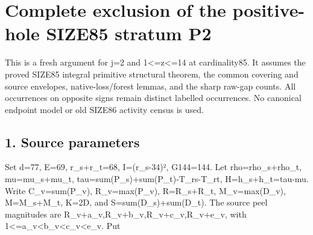\documentclass[10pt,a4paper]{article}
\theoremstyle{definition}
\begin{document}
\clearpage
\hypertarget{complete-exclusion-of-the-positive-hole-size85-stratum-p2}{%
\section{Complete exclusion of the positive-hole SIZE85 stratum
P2}\label{complete-exclusion-of-the-positive-hole-size85-stratum-p2}}

This is a fresh argument for j=\allowbreak{}2 and 1\textless=\allowbreak{}z\textless=\allowbreak{}14 at
cardinality85. It assumes the proved SIZE85 integral primitive
structural theorem,\allowbreak{} the common covering and source envelopes,\allowbreak{}
native-loss/forest lemmas,\allowbreak{} and the sharp raw-gap counts. All occurrences
on opposite signs remain distinct labelled occurrences. No canonical
endpoint model or old SIZE86 activity census is used.

\hypertarget{source-parameters}{%
\subsection{1. Source parameters}\label{source-parameters}}

Set d=\allowbreak{}77,\allowbreak{} \textbar E\textbar=\allowbreak{}69,\allowbreak{} r\_\allowbreak{}s+\allowbreak{}r\_\allowbreak{}t=\allowbreak{}68,\allowbreak{} I=\allowbreak{}(r\_\allowbreak{}s-34)²,\allowbreak{} G144=\allowbreak{}144.
Let rho=\allowbreak{}rho\_\allowbreak{}s+\allowbreak{}rho\_\allowbreak{}t,\allowbreak{} mu=\allowbreak{}mu\_\allowbreak{}s+\allowbreak{}mu\_\allowbreak{}t,\allowbreak{}
tau=\allowbreak{}sum(P\_\allowbreak{}s)+\allowbreak{}sum(P\_\allowbreak{}t)-T\_\allowbreak{}rs-T\_\allowbreak{}rt,\allowbreak{} H=\allowbreak{}h\_\allowbreak{}s+\allowbreak{}h\_\allowbreak{}t=\allowbreak{}tau-mu. Write
C\_\allowbreak{}v=\allowbreak{}sum(P\_\allowbreak{}v),\allowbreak{} R\_\allowbreak{}v=\allowbreak{}max(P\_\allowbreak{}v),\allowbreak{} R=\allowbreak{}R\_\allowbreak{}s+\allowbreak{}R\_\allowbreak{}t,\allowbreak{} M\_\allowbreak{}v=\allowbreak{}max(D\_\allowbreak{}v),\allowbreak{}
M=\allowbreak{}M\_\allowbreak{}s+\allowbreak{}M\_\allowbreak{}t,\allowbreak{} K=\allowbreak{}\textbar2D\textbar,\allowbreak{} and S=\allowbreak{}sum(D\_\allowbreak{}s)+\allowbreak{}sum(D\_\allowbreak{}t). The source
peel magnitudes are R\_\allowbreak{}v+\allowbreak{}a\_\allowbreak{}v,\allowbreak{}R\_\allowbreak{}v+\allowbreak{}b\_\allowbreak{}v,\allowbreak{}R\_\allowbreak{}v+\allowbreak{}c\_\allowbreak{}v,\allowbreak{}R\_\allowbreak{}v+\allowbreak{}e\_\allowbreak{}v,\allowbreak{} with
1\textless=\allowbreak{}a\_\allowbreak{}v\textless b\_\allowbreak{}v\textless c\_\allowbreak{}v\textless e\_\allowbreak{}v. Put
\end{document}

